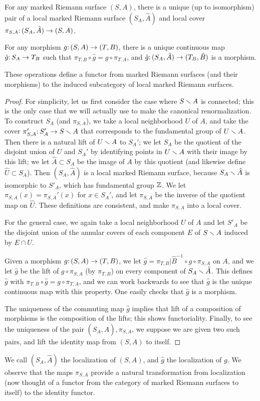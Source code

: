 \begin{theorem}
For any marked Riemann surface $(S, A)$, 
there is a unique (up to isomorphism) pair of a local marked Riemann surface $(S_A, \hat A)$ and local cover $\pi_{S,A}\mathpunct: (S_A, \hat A) \to (S, A)$.

For any morphism $g\mathpunct: (S, A) \to (T, B)$,
there is a unique continuous map $\hat g\mathpunct: S_A \to T_B$ such that $\pi_{T, B} \circ \hat g = g \circ \pi_{T, A}$,
and $\hat g\mathpunct: (S_A, \hat A) \to (T_B, \hat B)$ is a morphism. 

These operations define a functor from marked Riemann surfaces (and their morphisms) to the induced subcategory of local marked Riemann surfaces. 
\end{theorem}
\begin{proof}
For simplicity,
let us first consider the case where $S \smallsetminus A$ is connected;
this is the only case that we will actually use to make the canonical renormalization. 
To construct $S_A$ (and $\pi_{S, A}$),
we take a local neighborhood $U$ of $A$,
and take the cover $\pi'_{S, A}\mathpunct: S'_A \to S \smallsetminus A$ that
corresponds to the fundamental group of $U \smallsetminus A$. 
Then there is a natural lift of $U \smallsetminus A$ to $S_A'$;
we let $S_A$ be the quotient of the disjoint union of $U$ and $S_A'$ by identifying points in $U \smallsetminus A$ with their image by this lift;
we let $\hat A \subset S_A$ be the image of $A$ by this quotient (and likewise define $\hat U \subset S_A$). 
Then $(S_A, \hat A)$ is a local marked Riemann surface, 
because $S_A \smallsetminus \hat A$ is isomorphic to $S'_A$,
which has fundamental group ${\Bbb Z}$.
We let $\pi_{S, A}(x) = \pi_{S, A}'(x)$ for $x \in S_A'$, and let $\pi_{S, A}$ be the inverse of the quotient map on $\hat U$.
These definitions are consistent, and make $\pi_{S, A}$ into a local cover.  

For the general case, 
we again take a local neighborhood $U$ of $A$ and
let $S'_A$ be the disjoint union of the annular covers of each component $E$ of $S \smallsetminus A$ induced by $E \cap U$.


Given a morphism $g\mathpunct: (S, A)\to (T, B)$,
we let $\hat g = \pi_{T, B}|{\hat B}^{-1} \circ g \circ \pi_{S, A}$ on $A$,
and we let $\hat g$ be the lift of $g \circ \pi_{S, A}$ (by $\pi_{T, B}$) on every component of $S_A \smallsetminus \hat A$.
This defines $\hat g$ with $\pi_{T, B} \circ \hat g = g \circ \pi_{T, A}$,
and we can work backwards to see that $\hat g$ is the unique continuous map with this property.
One easily checks that $\hat g$ is a morphism.

The uniqueness of the commuting map $\hat g$ implies that lift of a composition of morphisms is the composition of the lifts; this shows functoriality. Finally, to see the uniqueness of the pair $(S_A, \hat A), \pi_{S, A}$, we suppose we are given two such pairs, and lift the identity map from $(S, A)$ to itself.
\end{proof}
We call  $(S_A, \hat A)$ the localization of $(S, A)$, 
and $\hat g$ the localization of $g$. 
We observe that the maps $\pi_{S, A}$ provide a natural transformation from localization 
(now thought of a functor from the category of marked Riemann surfaces to itself) to the identity functor.

